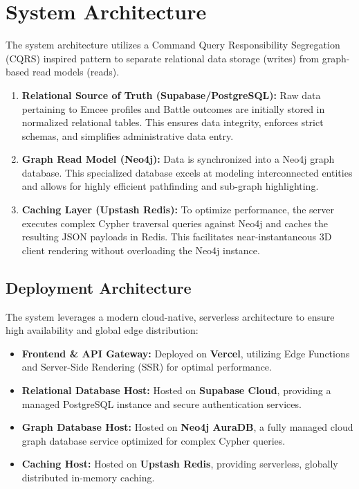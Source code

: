 \documentclass[12pt,a4paper]{article}
\begin{document}
\section{System Architecture}

The system architecture utilizes a Command Query Responsibility Segregation (CQRS) inspired pattern to separate relational data storage (writes) from graph-based read models (reads).

\begin{enumerate}
    \item \textbf{Relational Source of Truth (Supabase/PostgreSQL):} Raw data pertaining to Emcee profiles and Battle outcomes are initially stored in normalized relational tables. This ensures data integrity, enforces strict schemas, and simplifies administrative data entry.
    \item \textbf{Graph Read Model (Neo4j):} Data is synchronized into a Neo4j graph database. This specialized database excels at modeling interconnected entities and allows for highly efficient pathfinding and sub-graph highlighting.
    \item \textbf{Caching Layer (Upstash Redis):} To optimize performance, the server executes complex Cypher traversal queries against Neo4j and caches the resulting JSON payloads in Redis. This facilitates near-instantaneous 3D client rendering without overloading the Neo4j instance.
\end{enumerate}

\subsection{Deployment Architecture}
The system leverages a modern cloud-native, serverless architecture to ensure high availability and global edge distribution:
\begin{itemize}
    \item \textbf{Frontend \& API Gateway:} Deployed on \textbf{Vercel}, utilizing Edge Functions and Server-Side Rendering (SSR) for optimal performance.
    \item \textbf{Relational Database Host:} Hosted on \textbf{Supabase Cloud}, providing a managed PostgreSQL instance and secure authentication services.
    \item \textbf{Graph Database Host:} Hosted on \textbf{Neo4j AuraDB}, a fully managed cloud graph database service optimized for complex Cypher queries.
    \item \textbf{Caching Host:} Hosted on \textbf{Upstash Redis}, providing serverless, globally distributed in-memory caching.
\end{itemize}
\end{document}
